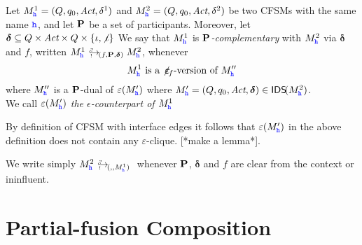 \begin{definition}
\end{definition}



\begin{definition}
\label{def:Pcomplementarity}
Let $M^1_\hh = (Q, q_0, \textit{Act}, \delta^1)$ and 
$M^2_\hh = (Q, q_0, \textit{Act}, \delta^2)$  
be two CFSMs with the same name $\hh$, and let $\roles$ be a set of participants.
Moreover, let $\bm{\delta} \subseteq Q\times\textit{Act}\times Q \times \Set{\intf,\nintf}$
We say that
$M^1_\hh$ is {\em $\roles$-complementary} with $M^2_\hh$ via $\bm{\delta}$ and $f$, written $\emb{f}{\roles}{\bm{\delta}}{M^1_\hh}{M^2_\hh}$, whenever 
$$M^1_\hh \text{ is a $\noeps_{\!f}$-version of } M''_\hh$$
where $M''_\hh$ is a $\roles$-dual of $\varepsilon(M'_\hh)$ where $M'_\hh= (Q, q_0, \textit{Act}, \bm{\delta})\in\IDS(M^2_\hh)$.\\
We call $\varepsilon(M'_\hh)$ {\em the $\epsilon$-counterpart of $M^1_\hh$}
\end{definition}

By definition of CFSM with interface edges it follows that $\varepsilon(M'_\hh)$ in the above definition
does not contain any $\varepsilon$-clique. [*make a lemma*].

We write simply $\emb{}{\bm{}}{M^1_\hh}{M^2_\hh}$ whenever
$\roles$, $\bm\delta$ and $f$ are clear from the context or ininfluent.




\section{Partial-fusion Composition}

